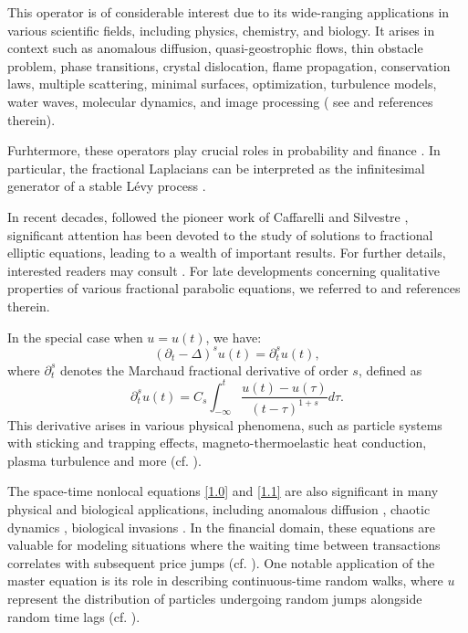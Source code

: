 \documentclass[12pt]{article}
\theoremstyle{remark}
\numberwithin{equation}{section}
\newcommand{\fr}{\displaystyle\frac}
\newcommand{\jf}{\displaystyle\int}
\begin{document}
This operator is of considerable interest due to its wide-ranging applications in various scientific fields, including  physics, chemistry, and biology. It arises in context such as anomalous diffusion, quasi-geostrophic flows,
thin obstacle problem, phase transitions, crystal dislocation, flame propagation, conservation
laws, multiple scattering, minimal surfaces, optimization, turbulence models, water waves,
molecular dynamics, and image processing ( see \cite{AB, BG, CV, GO} and references therein).

Furhtermore, these operators play crucial roles in probability
and finance \cite{Be} \cite{CT} \cite{RSM}. In particular, the fractional Laplacians can be interpreted as the
infinitesimal generator of a stable L\'{e}vy process \cite{Be}.

In recent decades, followed the pioneer work of Caffarelli and Silvestre \cite{CS}, significant attention has been devoted to the study of solutions to fractional elliptic equations, leading to a wealth of important results. For further details,  interested readers may consult \cite{AGHW, AWY, CL, CLL, CLL1, CLZ,  CZhu, CW, CWW, DLL, FLS, KMW, LLW, LW, LWX, LZ, LZ1}. For late developments concerning qualitative properties of various fractional parabolic equations, we referred to \cite{CG, CM, GMZ2, WuC}  and references therein.

In the special case when $u=u(t)$, we have:
 \begin{equation*}
   (\partial_t-\Delta)^s u(t)=\partial_t^s u(t),
 \end{equation*}
where $\partial_t^s$ denotes the Marchaud fractional derivative of order $s$, defined as \begin{equation}\label{1.00}
\partial^s_t u(t)=C_s \jf_{-\infty}^t\fr{u(t)-u(\tau)}{(t-\tau)^{1+s}}d\tau.
\end{equation}
This derivative arises in various physical phenomena, such as
particle systems with sticking and trapping effects, magneto-thermoelastic heat conduction, plasma turbulence and more (cf. \cite{ACV,ACV1, DCL1, DCL2, EE}).

The space-time nonlocal equations \eqref{1.0} and \eqref{1.1} are also significant in many physical and biological applications, including anomalous diffusion \cite{KBS}, chaotic dynamics \cite{Z}, biological invasions \cite{BRR}. In the financial domain, these equations are valuable for modeling situations where the waiting time between transactions correlates with subsequent price jumps (cf. \cite{RSM}). One notable application of the master equation is its role in describing continuous-time random walks, where $u$ represent the distribution of particles undergoing random jumps alongside random time lags (cf. \cite{MK}).
\medskip
\end{document}
